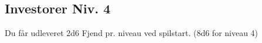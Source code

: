 \subsection*{Investorer Niv. 4}
Du får udleveret 2d6 Fjend pr. niveau ved spilstart. (8d6 for niveau 4)\\